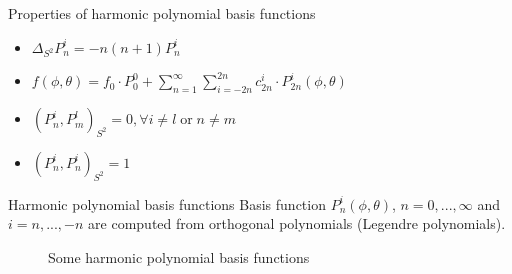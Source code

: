
\begin{frame}{Properties of harmonic polynomial basis functions}
	\begin{itemize}
		\item $\Delta_{S^2}P^i_n = -n(n+1) P^i_n$
		\vspace{12pt}
		\item $	f(\phi, \theta) = f_0 \cdot P_0^0 + \sum_{n=1}^{\infty} \sum_{i=-2n}^{2n} c^i_{2n} \cdot P^i_{2n}(\phi, \theta)$
		\vspace{12pt}
		\item $(P^i_n, P^l_m)_{S^2} = 0, \forall i \neq l \; \text{or} \; n \neq m$
		\vspace{12pt}
		\item $	(P^i_n, P^i_n)_{S^2} = 1$
	\end{itemize}
\end{frame}

\begin{frame}{Harmonic polynomial basis functions}
	Basis function ${P}^{i}_{n}(\phi, \theta)$, $n = 0, ..., \infty$ and $i = n, ..., -n$ are computed from orthogonal polynomials (Legendre polynomials). 
	\vspace{20pt}
	\begin{figure}
		\centering
		\qquad
		\qquad
		\qquad
		\caption{Some harmonic polynomial basis functions}
	\end{figure}
\end{frame}


\begin{comment}
\begin{frame}{Harmonic polynomial basis functions}
	\scriptsize
	Let ${P}^{i}_{n}(\phi, \theta)$ with $n = 0, ..., \infty$ and $i = n, ..., -n$ be the basis function
	\begin{align*}
		TODO
	\end{align*}
	The scalar product of any two basis functions over sphere is defined as follows
	\begin{align*}
		<P^i_n, P^l_m>_{S^2} = \int_{0}^{2\pi} \int_{0}^{\pi} P^{i}_{n}(\phi, \theta) \cdot P^{l}_{m}(\phi, \theta) \cdot \sin(\theta) d\theta d\phi.
	\end{align*}
\end{frame}
\end{comment}

